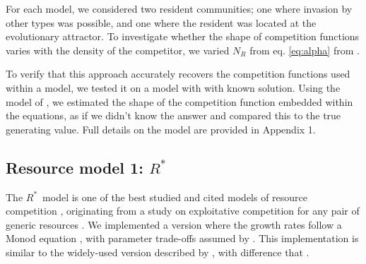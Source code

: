 \documentclass[a4paper,11pt]{article}
\newcommand{\verify}[1]{{\color{navy}{(verify: #1)}}}
\newcommand{\Rstar}{\ensuremath{R^*}}
\begin{document}
For each model, we considered two resident communities; one where invasion by other types was possible, and one where the resident was located at the evolutionary attractor. To investigate whether the shape of competition functions varies with the density of the competitor, we varied $N_R$ from eq. \ref{eq:alpha} from \verify{ its equilibrium value of $N_R=K(x_R)$}.

To verify that this approach accurately recovers the competition functions used within a model, we tested it on a model with with known solution. Using the model of \citet{Dieckmann-1999}, we estimated the shape of the competition function embedded within the equations, as if we didn't know the answer and compared this to the true generating value. Full details on the model are provided in Appendix 1.

\subsection{Resource model 1: \Rstar }

The \Rstar\ model is one of the best studied and cited models of resource competition \citep{Tilman-1977, Tilman-1982, Huisman-2001}, originating from a study on exploitative competition for any pair of generic resources \citep{Leon-1975}. We implemented a version where the growth rates follow a Monod equation \citep{Huisman-2001}, with parameter trade-offs assumed by \citet{Fox-2008}. This implementation is similar to the widely-used version described by \citet{Tilman-1977, Tilman-1982}, with difference that \verify{ (GJK)  What is the difference with Tilman 1977?}. 

\verify{I have shifted the model description from the appendix back into the main text, and tried to make it more streamlined. (GJK)  please review to ensure no meaning has been lost. }
\end{document}

